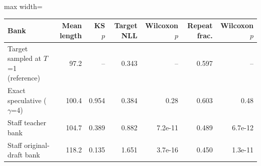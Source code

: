 \scriptsize
\setlength{\tabcolsep}{3.5pt}
\label{tab:t3consist}
\begin{adjustbox}{max width=\linewidth}
\begin{tabular}{lrrrrrr}
\toprule
Bank & Mean length & KS $p$ & Target NLL & Wilcoxon $p$ & Repeat frac. & Wilcoxon $p$ \\
\midrule
Target sampled at $T$=1 (reference) & 97.2 & -- & 0.343 & -- & 0.597 & -- \\
Exact speculative ($\gamma$=4) & 100.4 & 0.954 & 0.384 & 0.28 & 0.603 & 0.48 \\
Staff teacher bank & 104.7 & 0.389 & 0.882 & 7.2e-11 & 0.489 & 6.7e-12 \\
Staff original-draft bank & 118.2 & 0.135 & 1.651 & 3.7e-16 & 0.450 & 1.3e-11 \\
\bottomrule
\end{tabular}
\end{adjustbox}
